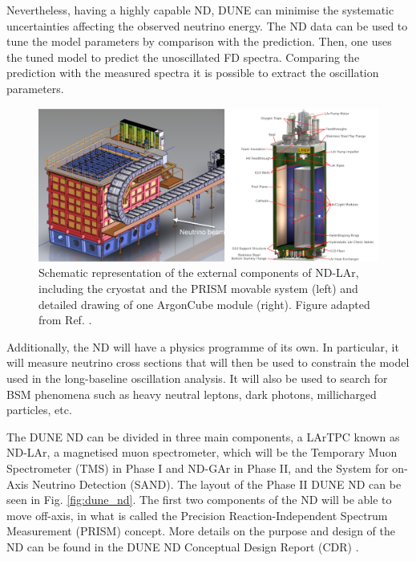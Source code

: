 Nevertheless, having a highly capable ND, DUNE can minimise the systematic uncertainties affecting the observed neutrino energy. The ND data can be used to tune the model parameters by comparison with the prediction. Then, one uses the tuned model to predict the unoscillated FD spectra. Comparing the prediction with the measured spectra it is possible to extract the oscillation parameters.

\begin{figure}[t]
	\centering
	\includegraphics[width=0.99\linewidth]{Images/DUNE/ND/nd_lar_mod}
	\caption[Schematic representation of the external components of ND-LAr, including the cryostat and the PRISM movable system and detailed drawing of one ArgonCube module.]{Schematic representation of the external components of ND-LAr, including the cryostat and the PRISM movable system (left) and detailed drawing of one ArgonCube module (right). Figure adapted from Ref. \cite{DUNE2020TDR1}.}
	\label{fig:dune_nd_lar}
\end{figure}

Additionally, the ND will have a physics programme of its own. In particular, it will measure neutrino cross sections that will then be used to constrain the model used in the long-baseline oscillation analysis. It will also be used to search for BSM phenomena such as heavy neutral leptons, dark photons, millicharged particles, etc.

The DUNE ND can be divided in three main components, a LArTPC known as ND-LAr, a magnetised muon spectrometer, which will be the Temporary Muon Spectrometer (TMS) in Phase I and ND-GAr in Phase II, and the System for on-Axis Neutrino Detection (SAND). The layout of the Phase II DUNE ND can be seen in Fig. \ref{fig:dune_nd}. The first two components of the ND will be able to move off-axis, in what is called the Precision Reaction-Independent Spectrum Measurement (PRISM) concept. More details on the purpose and design of the ND can be found in the DUNE ND Conceptual Design Report (CDR) \cite{DUNE2021NDCDR}.

